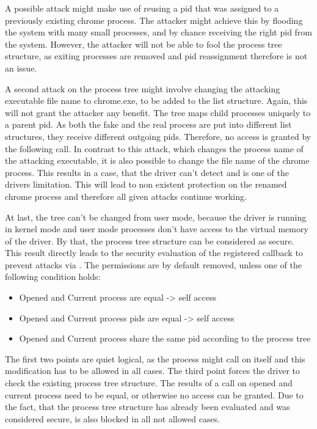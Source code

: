 A possible attack might make use of reusing a pid that was assigned to a previously existing chrome process. The attacker might achieve this by flooding the system with many small processes, and by chance receiving the right pid from the system. However, the attacker will not be able to fool the process tree structure, as exiting processes are removed and pid reassignment therefore is not an issue. 

A second attack on the process tree might involve changing the attacking executable file name to chrome.exe, to be added to the list structure. Again, this will not grant the attacker any benefit. The tree maps child processes uniquely to a parent pid. As both the fake and the real process are put into different list structures, they receive different outgoing pids. Therefore, no access is granted by the following  call. In contrast to this attack, which changes the process name of the attacking executable, it is also possible to change the file name of the chrome process. This results in a case, that the driver can't detect and is one of the drivers limitation. This will lead to non existent protection on the renamed chrome process and therefore all given attacks continue working.

At last, the tree can't be changed from user mode, because the driver is running in kernel mode and user mode processes don't have access to the virtual memory of the driver. By that, the process tree structure can be considered as secure. This result directly leads to the security evaluation of the registered callback to prevent attacks via . The permissions are by default removed, unless one of the following condition holds:
\begin{itemize}
\item Opened and Current process are equal -> self access
\item Opened and Current process pids are equal -> self access
\item Opened and Current process share the same pid according to the process tree
\end{itemize}
The first two points are quiet logical, as the process might call  on itself and this modification has to be allowed in all cases. The third point forces the driver to check the existing process tree structure. The results of a  call on opened and current process need to be equal, or otherwise no access can be granted. Due to the fact, that the process tree structure has already been evaluated and was considered secure,  is also blocked in all not allowed cases. 

